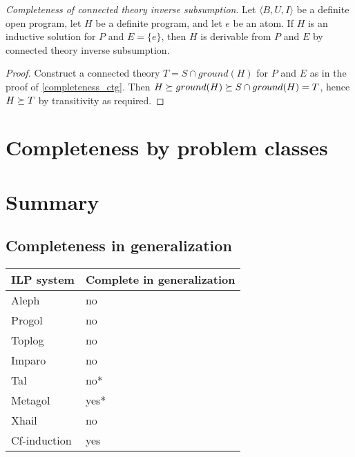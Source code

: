 \begin{thm}
\emph{Completeness of connected theory inverse subsumption}.
\label{completeness_ctis}
Let $\langle B, U, I \rangle$ be a definite open program,
let $H$ be a definite program, and let $e$ be an atom.
If $H$ is an inductive solution for $P$ and
$E = \{e\}$, then $H$ is derivable from $P$ and $E$ by connected theory inverse subsumption.
\end{thm}
\begin{proof}
Construct a connected theory $T=S \cap ground(H)$ for $P$ and $E$ as in the proof of \ref{completeness_ctg}.
Then $H \succeq ground(H) \succeq S \cap ground(H) = T$,
hence $H \succeq T$ by transitivity as required.
\end{proof}

\section{Completeness by problem classes}

\section{Summary}

\subsection{Completeness in generalization\cite{yamamoto2012inverse}}
\begin{center}
    \begin{tabular}{ | l | p{5cm} |}
    \hline
    ILP system &  Complete in generalization \\ \hline
    Aleph & no\\ \hline
    Progol & no\\ \hline
    Toplog & no\\ \hline
    Imparo & no\\ \hline
    Tal & no*\\ \hline
    Metagol & yes*\\ \hline
    Xhail & no\\ \hline
    Cf-induction & yes\\
    \hline
    \end{tabular}
\end{center}


